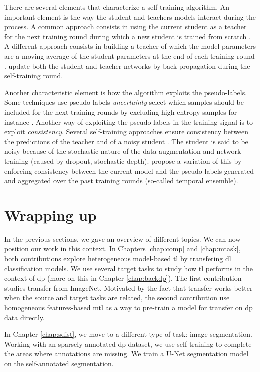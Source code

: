There are several elements that characterize a self-training algorithm. An important element is the way the student and teachers models interact during the process. A common approach consists in using the current student as a teacher for the next training round during which a new student is trained from scratch \parencite{yarowsky1995unsupervised, xie2020self}. A different approach consists in building a teacher of which the model parameters are a moving average of the student parameters at the end of each training round \parencite{tarvainen2017mean}. \cite{pham2021meta} update both the student and teacher networks by back-propagation during the self-training round. 

Another characteristic element is how the algorithm exploits the pseudo-labels. Some techniques use pseudo-labels \textit{uncertainty} select which samples should be included for the next training rounds by excluding high entropy samples for instance \parencite{grandvalet2004semi, lee2013pseudo}. Another way of exploiting the pseudo-labels in the training signal is to exploit \textit{consistency}. Several self-training approaches ensure consistency between the predictions of the teacher and of a noisy student \parencite{xie2020self, zhu2020improving, sohn2020fixmatch, tarvainen2017mean}. The student is said to be noisy because of the stochastic nature of the data augmentation and network training (\eg caused by dropout, stochastic depth). \parencite{laine2016temporal} propose a variation of this by enforcing consistency between the current model and the pseudo-labels generated and aggregated over the past training rounds (so-called temporal ensemble).

\section{Wrapping up}
\label{sec:backml:wrapup}

In the previous sections, we gave an overview of different topics. We can now position our work in this context. In Chapters \ref{chap:comp}
and \ref{chap:mtask}, both contributions explore heterogeneous model-based
\acrlong{tl} by transfering \acrlong{dl} classification models. We use several
target tasks to study how \acrlong{tl} performs in the context of \acrlong{dp}
(more on this in Chapter \ref{chap:backdp}). The first contribution studies transfer
from ImageNet. Motivated by the fact that transfer works better when the source
and target tasks are related, the second contribution use homogeneous features-based
\acrlong{mtl} as a way to pre-train a model for transfer on \acrlong{dp} data
directly.

In Chapter \ref{chap:sdist}, we move to a different type of task: image segmentation.
Working with an sparsely-annotated \acrlong{dp} dataset, we use self-training to
complete the areas where annotations are missing. We train a U-Net segmentation
model on the self-annotated segmentation.

